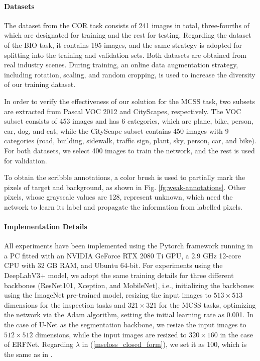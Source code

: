 \documentclass[journal]{IEEEtran}
\begin{document}
\paragraph{Datasets}The dataset from the COR task consists of 241 images in total, three-fourths of which are designated for training and the rest for testing. Regarding the dataset of the BIO task, it contains 195 images, and the same strategy is adopted for splitting into the training and validation sets. Both datasets are obtained from real industry scenes. During training, an online data augmentation strategy, including rotation, scaling, and random cropping, is used to increase the diversity of our training dataset. 

In order to verify the effectiveness of our solution for the MCSS task, two subsets are extracted from Pascal VOC 2012 and CityScapes, respectively. The VOC subset consists of 453 images and has 6 categories, which are plane, bike, person, car, dog, and cat, while the CityScape subset contains 450 images with 9 categories (road, building, sidewalk, traffic sign, plant, sky, person, car, and bike). For both datasets, we select 400 images to train the network, and the rest is used for validation. 

To obtain the scribble annotations, a color brush is used to partially mark the pixels of target and background, as shown in Fig. \ref{fg:weak-annotations}. Other pixels, whose grayscale values are 128, represent unknown, which need the network to learn its label and propagate the information from labelled pixels. 

\paragraph{Implementation Details}
All experiments have been implemented using the Pytorch framework running in a PC fitted with an NVIDIA GeForce RTX 2080 Ti GPU, a 2.9 GHz 12-core CPU with 32 GB RAM, and Ubuntu 64-bit. For experiments using the DeepLabV3+ model, we adopt the same training details for three different backbones (ResNet101, Xception, and MobileNet), i.e., initializing the backbones using the ImageNet \cite{russakovsky2015imagenet} pre-trained model, resizing the input images to $513\times 513$ dimensions for the inspection tasks and $321 \times 321$ for the MCSS tasks, optimizing the network via the Adam algorithm, setting the initial learning rate as 0.001. In the case of U-Net as the segmentation backbone, we resize the input images to $512\times 512$ dimensions, while the input images are resized to $320\times 160$ in the case of ERFNet. Regarding $\lambda$ in (\ref{mseloss_closed_form}), we set it as 100, which is the same as in \cite{levin2007closed}. 
\end{document}
